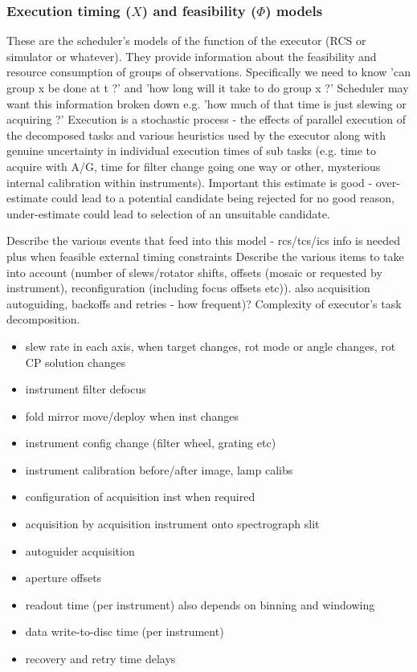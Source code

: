 \subsubsection{Execution timing ($X$) and feasibility ($\Phi$) models}
These are the scheduler's models of the function of the executor (RCS or simulator or whatever). They provide information about the feasibility and resource consumption of groups of observations. Specifically we need to know 'can group x be done at t ?' and 'how long will it take to do group x ?' Scheduler may want this information broken down e.g. 'how much of that time is just slewing or acquiring ?' Execution is a stochastic process - the effects of parallel execution of the decomposed tasks and various heuristics used by the executor along with genuine uncertainty in individual execution times of sub tasks (e.g. time to acquire with A/G, time for filter change going one way or other, mysterious internal calibration within instruments). Important this estimate is good - over-estimate could lead to a potential candidate being rejected for no good reason, under-estimate could lead to selection of an unsuitable candidate.

Describe the various events that feed into this model - rcs/tcs/ics info is needed plus when feasible external timing constraints
Describe the various items to take into account (number of slews/rotator shifts, offsets (mosaic or requested by instrument), reconfiguration (including focus offsets etc)). also acquisition autoguiding, backoffs and retries - how frequent)? Complexity of executor's task decomposition.

\begin{itemize}
\item slew rate in each axis, when target changes, rot mode or angle changes, rot CP solution changes
\item instrument filter defocus
\item fold mirror move/deploy when inst changes
\item instrument config change (filter wheel, grating etc)
\item instrument calibration before/after image, lamp calibs
\item configuration of acquisition inst when required
\item acquisition by acquisition instrument onto spectrograph slit
\item autoguider acquisition
\item aperture offsets
\item readout time (per instrument) also depends on binning and windowing
\item data write-to-disc time (per instrument)
\item recovery and retry time delays
\end{itemize}

